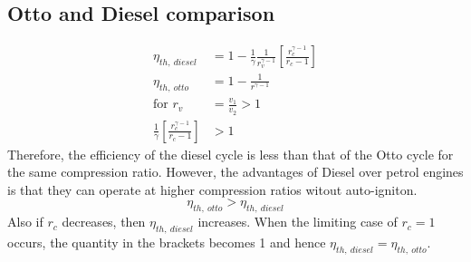 \subsection{Otto and Diesel comparison}
\begin{align}
  \eta_{th, \ diesel}                                             & = 1 - \frac{1}{\gamma} \frac{1}{r_v^{\gamma -1}} \left[ \frac{r_c^{\gamma -1}}{r_c - 1} \right] \\
  \eta_{th, \ otto}                                               & = 1 - \frac{1}{r^{\gamma -1}}                                                                   \\
  \textrm{for } r_v                                               & = \frac{v_1}{v_2} > 1                                                                           \\
  \frac{1}{\gamma} \left[ \frac{r_c^{\gamma -1}}{r_c - 1} \right] & > 1
\end{align}
Therefore, the efficiency of the diesel cycle is less than that of the Otto cycle for the same compression ratio. However, the advantages of Diesel over petrol engines is that they can operate at higher compression ratios witout auto-igniton.
\begin{equation}
  \eta_{th, \ otto} > \eta_{th, \ diesel}
\end{equation}
Also if $r_c$ decreases, then $\eta_{th, \ diesel}$ increases. When the limiting case of $r_c = 1$ occurs, the quantity in the brackets becomes 1 and hence $\eta_{th, \ diesel} = \eta_{th, \ otto}$.
